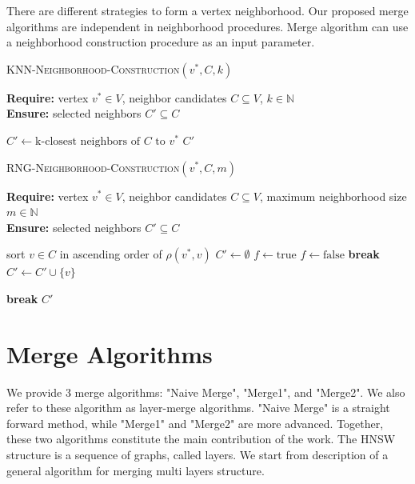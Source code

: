 \documentclass{article}
\begin{document}
There are different strategies to form a vertex neighborhood. Our proposed merge algorithms are independent in neighborhood procedures. Merge algorithm can use a neighborhood construction procedure as an input parameter.

\begin{algorithm}
\caption{\textsc{KNN-Neighborhood-Construction}$(v^*,C, k)$}
\label{alg:knntrategy}
\textbf{Require:} vertex $v^* \in V$, neighbor candidates $C \subseteq V$, $k \in \mathbb{N} $\\
\textbf{Ensure:} selected neighbors $C' \subseteq C$
\begin{algorithmic}[1]
    
    \State $C' \gets \text{k-closest neighbors of } C \text{ to } v^*$
    \State \Return $C'$
\end{algorithmic}
\end{algorithm}

\begin{algorithm}
\caption{\textsc{RNG-Neighborhood-Construction}$(v^*, C, m)$}
\label{alg:rngstrategy}
\textbf{Require:} vertex $v^* \in V$, neighbor candidates $C \subseteq V$, maximum neighborhood size $m \in \mathbb{N}$\\
\textbf{Ensure:} selected neighbors $C' \subseteq C$
\begin{algorithmic}[1]
    \State sort $v \in C$ in ascending order of $\rho(v^*,v)$
    \State $C' \gets \emptyset$
        \State $f \gets \text{true}$
                \State $f \gets \text{false}$
                \State \textbf{break}
            \EndIf
        \EndFor
            \State $C' \gets C' \cup \{v\}$
        \EndIf

            \State \textbf{break}
        \EndIf
    \EndFor
    \State \Return $C'$
\end{algorithmic}
\end{algorithm}

\section{Merge Algorithms}

We provide 3 merge algorithms: "Naive Merge", "Merge1", and "Merge2". We also refer to these algorithm as layer-merge algorithms. "Naive Merge" is a straight forward method, while "Merge1" and "Merge2" are more advanced. Together, these two algorithms constitute the main contribution of the work. The HNSW structure is a sequence of graphs, called layers. We start from description of a general algorithm for merging multi layers structure.
\end{document}
